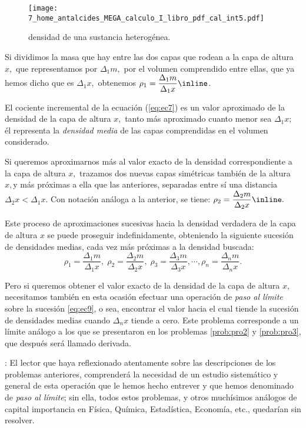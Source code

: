 \begin{solucion}
\begin{wrapfigure}{r}{0.4\linewidth}
\texttt{[image: 7\_home\_antalcides\_MEGA\_calculo\_I\_libro\_pdf\_cal\_int5.pdf]}
\caption{densidad de una sustancia heterogénea.}
\label{fig:myfig5} \end{wrapfigure}

Si dividimos la masa que hay entre las dos capas que rodean a la capa
de altura $x,$ que representamos por $\Delta_{1}m,$ por el volumen
comprendido entre ellas, que ya hemos dicho que es $\Delta_{1}x,$
obtenemos $\rho_{1}=\dfrac{\Delta_{1}m}{\Delta_{1}x}\inline\text{\label{eq:ec7}}$.

El cociente incremental de la ecuación (\ref{eq:ec7}) es un valor
aproximado de la densidad de la capa de altura $x,$ tanto más aproximado
cuanto menor sea $\Delta_{1}x;$ él representa la \textsl{densidad
media} de las capas comprendidas en el volumen considerado.

Si queremos aproximarnos más al valor exacto de la densidad correspondiente
a la capa de altura $x,$ trazamos dos nuevas capas simétricas también
de la altura $x,$y más próximas a ella que las anteriores, separadas
entre sí una distancia $\Delta_{2}x<\Delta_{1}x.$ Con notación análoga
a la anterior, se tiene: $\rho_{2}=\dfrac{\Delta_{2}m}{\Delta_{2}x}\inline\text{\label{eq:ec8}.}$

Este proceso de aproximaciones sucesivas hacia la densidad verdadera
de la capa de altura $x$ se puede proseguir indefinidamente, obteniendo
la siguiente sucesión de densidades medias, cada vez más próximas
a la densidad buscada:
\begin{equation}
\rho_{1}=\dfrac{\Delta_{1}m}{\Delta_{1}x},\;\rho_{2}=\dfrac{\Delta_{2}m}{\Delta_{2}x},\;\rho_{3}=\dfrac{\Delta_{3}m}{\Delta_{3}x},\cdots,\rho_{n}=\dfrac{\Delta_{n}m}{\Delta_{n}x}.\label{eq:ec9}
\end{equation}

Pero si queremos obtener el valor exacto de la densidad de la capa
de altura $x,$ necesitamos también en esta ocasión efectuar una operación
de\textsl{ paso al límite }sobre la sucesión \ref{eq:ec9}, o sea,
encontrar el valor hacia el cual tiende la sucesión de densidades
medias cuando $\Delta_{n}x$ tiende a cero. Este problema corresponde
a un límite análogo a los que se presentaron en los problemas \ref{prob:pro2}
y \ref{prob:pro3}, que después será llamado derivada.

\end{solucion}

\vspace*{2pt}\begin{nota}\peque

\emph{}: El lector que haya reflexionado atentamente
sobre las descripciones de los problemas anteriores, comprenderá la
necesidad de un estudio sistemático y general de esta operación que
le hemos hecho entrever y que hemos denominado de \textsl{paso al
límite}; sin ella, todos estos problemas, y otros muchísimos análogos
de capital importancia en Física, Química, Estadística, Economía,
etc., quedarían sin resolver.

\end{nota}\vspace*{2pt} 
